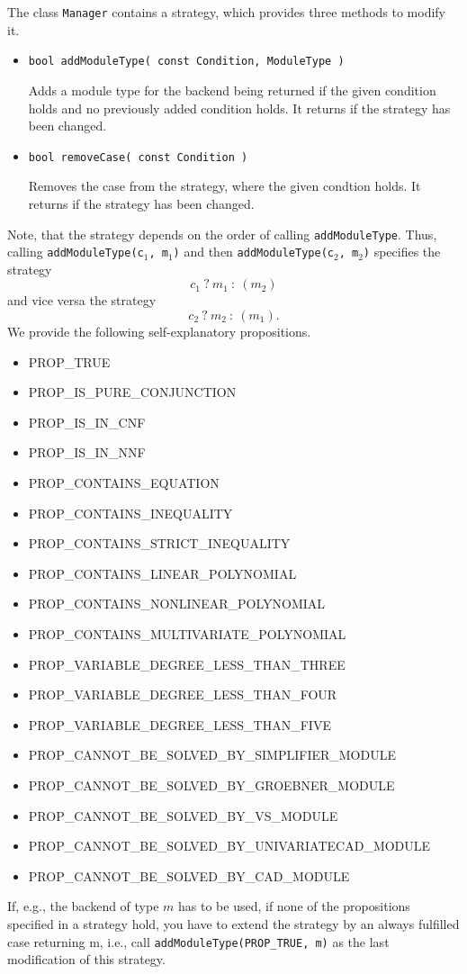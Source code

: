 The class \texttt{Manager} contains a strategy, which provides three methods to modify it.
\begin{itemize}
	\item \begin{verbatim}bool addModuleType( const Condition, ModuleType )\end{verbatim}
		Adds a module type for the backend being returned if the given condition holds and
		no previously added condition holds. It returns \true if the strategy has been changed.
	\item \begin{verbatim}bool removeCase( const Condition )\end{verbatim}
		Removes the case from the strategy, where the given condtion holds. It returns \true if 
		the strategy has been changed.
\end{itemize}
Note, that the strategy depends on the order of calling \texttt{addModuleType}. Thus, calling
\texttt{addModuleType(c$_1$, m$_1$)} and then \texttt{addModuleType(c$_2$, m$_2$)} specifies the
strategy $$c_1\ ?\ m_1\ :\ (m_2)$$ and vice versa the strategy
$$c_2\ ?\ m_2\ :\ (m_1).$$ We provide the following self-explanatory
propositions.
\begin{itemize}
	\item PROP\_TRUE
	\item PROP\_IS\_PURE\_CONJUNCTION
	\item PROP\_IS\_IN\_CNF
	\item PROP\_IS\_IN\_NNF
	\item PROP\_CONTAINS\_EQUATION
	\item PROP\_CONTAINS\_INEQUALITY
	\item PROP\_CONTAINS\_STRICT\_INEQUALITY
	\item PROP\_CONTAINS\_LINEAR\_POLYNOMIAL
	\item PROP\_CONTAINS\_NONLINEAR\_POLYNOMIAL
	\item PROP\_CONTAINS\_MULTIVARIATE\_POLYNOMIAL
	\item PROP\_VARIABLE\_DEGREE\_LESS\_THAN\_THREE
	\item PROP\_VARIABLE\_DEGREE\_LESS\_THAN\_FOUR
	\item PROP\_VARIABLE\_DEGREE\_LESS\_THAN\_FIVE
	\item PROP\_CANNOT\_BE\_SOLVED\_BY\_SIMPLIFIER\_MODULE
	\item PROP\_CANNOT\_BE\_SOLVED\_BY\_GROEBNER\_MODULE
	\item PROP\_CANNOT\_BE\_SOLVED\_BY\_VS\_MODULE
	\item PROP\_CANNOT\_BE\_SOLVED\_BY\_UNIVARIATECAD\_MODULE
	\item PROP\_CANNOT\_BE\_SOLVED\_BY\_CAD\_MODULE
\end{itemize}
If, e.g., the backend of type $m$ has to be used, if none of the propositions specified in a
strategy hold, you have to extend the strategy by an always fulfilled case returning
m, i.e., call \texttt{addModuleType(PROP\_TRUE, m)} as the last modification of this strategy.



